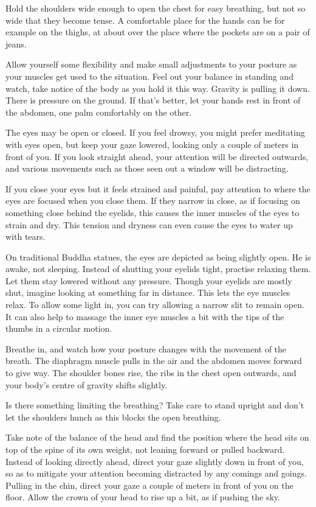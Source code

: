 Hold the shoulders wide enough to open the chest for easy breathing, but
not so wide that they become tense. A comfortable place for the hands
can be for example on the thighs, at about over the place where the
pockets are on a pair of jeans.

Allow yourself some flexibility and make small adjustments to your
posture as your muscles get used to the situation. Feel out your balance
in standing and watch, take notice of the body as you hold it this way.
Gravity is pulling it down. There is pressure on the ground. If that's
better, let your hands rest in front of the abdomen, one palm
comfortably on the other.

The eyes may be open or closed. If you feel drowsy, you might prefer
meditating with eyes open, but keep your gaze lowered, looking only a
couple of meters in front of you. If you look straight ahead, your
attention will be directed outwards, and various movements such as those
seen out a window will be distracting.

If you close your eyes but it feels strained and painful, pay attention
to where the eyes are focused when you close them. If they narrow in
close, as if focusing on something close behind the eyelids, this causes
the inner muscles of the eyes to strain and dry. This tension and
dryness can even cause the eyes to water up with tears.

On traditional Buddha statues, the eyes are depicted as being slightly
open. He is awake, not sleeping. Instead of shutting your eyelids tight,
practise relaxing them. Let them stay lowered without any pressure.
Though your eyelids are mostly shut, imagine looking at something far in
distance. This lets the eye muscles relax. To allow some light in, you
can try allowing a narrow slit to remain open. It can also help to
massage the inner eye muscles a bit with the tips of the thumbs in a
circular motion.

Breathe in, and watch how your posture changes with the movement of the
breath. The diaphragm muscle pulls in the air and the abdomen moves
forward to give way. The shoulder bones rise, the ribs in the chest open
outwards, and your body's centre of gravity shifts slightly.

\enlargethispage*{\baselineskip}

Is there something limiting the breathing? Take care to stand upright
and don't let the shoulders hunch as this blocks the open breathing.

Take note of the balance of the head and find the position where the
head sits on top of the spine of its own weight, not leaning forward or
pulled backward. Instead of looking directly ahead, direct your gaze
slightly down in front of you, so as to mitigate your attention becoming
distracted by any comings and goings. Pulling in the chin, direct your
gaze a couple of meters in front of you on the floor. Allow the crown of
your head to rise up a bit, as if pushing the sky.

